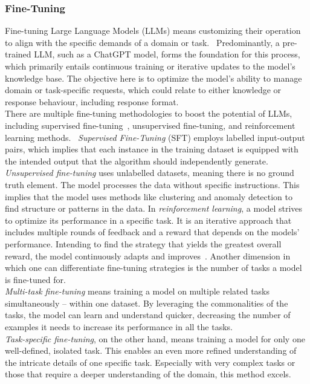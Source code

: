 \subsubsection*{Fine-Tuning}\label{sec:fine-tuning-def}
Fine-tuning Large Language Models (LLMs) means customizing their operation to align with the specific demands of a domain or task.~\cite{ovadia_fine-tuning_2024} Predominantly, a pre-trained LLM, such as a ChatGPT model, forms the foundation for this process, which primarily entails continuous training or iterative updates to the model's knowledge base. The objective here is to optimize the model's ability to manage domain or task-specific requests, which could relate to either knowledge or response behaviour, including response format.\\
There are multiple fine-tuning methodologies to boost the potential of LLMs, including supervised fine-tuning~\cite{zhou_enhancing_2024}, unsupervised fine-tuning, and reinforcement learning methods.~\cite{touvron_llama_2023} \emph{Supervised Fine-Tuning} (SFT) employs labelled input-output pairs, which implies that each instance in the training dataset is equipped with the intended output that the algorithm should independently generate. \emph{Unsupervised fine-tuning} uses unlabelled datasets, meaning there is no ground truth element. The model processes the data without specific instructions. This implies that the model uses methods like clustering and anomaly detection to find structure or patterns in the data. In \emph{reinforcement learning}, a model strives to optimize its performance in a specific task. It is an iterative approach that includes multiple rounds of feedback and a reward that depends on the models' performance. Intending to find the strategy that yields the greatest overall reward, the model continuously adapts and improves~\cite{ovadia_fine-tuning_2024}.
Another dimension in which one can differentiate fine-tuning strategies is the number of tasks a model is fine-tuned for.\\
\emph{Multi-task fine-tuning} means training a model on multiple related tasks simultaneously – within one dataset. By leveraging the commonalities of the tasks, the model can learn and understand quicker, decreasing the number of examples it needs to increase its performance in all the tasks.~\cite{pilault_conditionally_2020}\\
\emph{Task-specific fine-tuning}, on the other hand, means training a model for only one well-defined, isolated task. This enables an even more refined understanding of the intricate details of one specific task. Especially with very complex tasks or those that require a deeper understanding of the domain, this method excels.~\cite{xinxi_single_2021}

